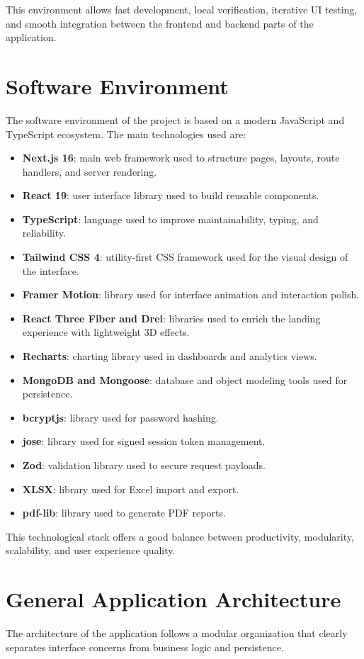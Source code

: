 This environment allows fast development, local verification, iterative UI testing, and smooth integration between the frontend and backend parts of the application.

\section{Software Environment}
The software environment of the project is based on a modern JavaScript and TypeScript ecosystem. The main technologies used are:

\begin{itemize}
\item \textbf{Next.js 16}: main web framework used to structure pages, layouts, route handlers, and server rendering.
\item \textbf{React 19}: user interface library used to build reusable components.
\item \textbf{TypeScript}: language used to improve maintainability, typing, and reliability.
\item \textbf{Tailwind CSS 4}: utility-first CSS framework used for the visual design of the interface.
\item \textbf{Framer Motion}: library used for interface animation and interaction polish.
\item \textbf{React Three Fiber and Drei}: libraries used to enrich the landing experience with lightweight 3D effects.
\item \textbf{Recharts}: charting library used in dashboards and analytics views.
\item \textbf{MongoDB and Mongoose}: database and object modeling tools used for persistence.
\item \textbf{bcryptjs}: library used for password hashing.
\item \textbf{jose}: library used for signed session token management.
\item \textbf{Zod}: validation library used to secure request payloads.
\item \textbf{XLSX}: library used for Excel import and export.
\item \textbf{pdf-lib}: library used to generate PDF reports.
\end{itemize}

This technological stack offers a good balance between productivity, modularity, scalability, and user experience quality.

\section{General Application Architecture}
The architecture of the application follows a modular organization that clearly separates interface concerns from business logic and persistence.

